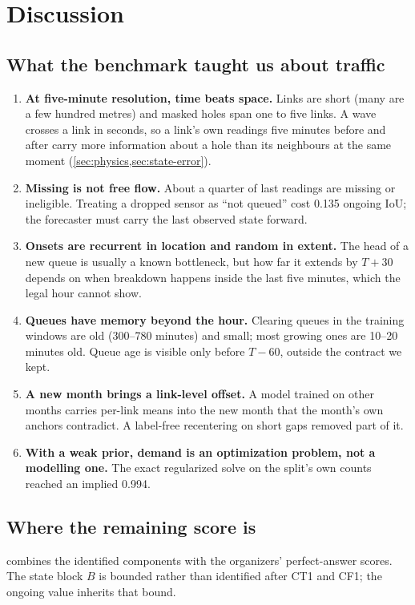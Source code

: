 \section{Discussion}\label{sec:discussion}

\subsection{What the benchmark taught us about traffic}
\begin{enumerate}
  \item \textbf{At five-minute resolution, time beats space.} Links are short (many are a few hundred metres) and masked
        holes span one to five links. A wave crosses a link in seconds, so a link's own readings five minutes before and
        after carry more information about a hole than its neighbours at the same moment (\cref{sec:physics,sec:state-error}).
  \item \textbf{Missing is not free flow.} About a quarter of last readings are missing or ineligible. Treating a dropped
        sensor as ``not queued'' cost 0.135 ongoing IoU; the forecaster must carry the last observed state forward.
  \item \textbf{Onsets are recurrent in location and random in extent.} The head of a new queue is usually a known
        bottleneck, but how far it extends by $T{+}30$ depends on when breakdown happens inside the last five minutes,
        which the legal hour cannot show.
  \item \textbf{Queues have memory beyond the hour.} Clearing queues in the training windows are old (300--780 minutes)
        and small; most growing ones are 10--20 minutes old. Queue age is visible only before $T{-}60$, outside the
        contract we kept.
  \item \textbf{A new month brings a link-level offset.} A model trained on other months carries per-link means into the
        new month that the month's own anchors contradict. A label-free recentering on short gaps removed part of it.
  \item \textbf{With a weak prior, demand is an optimization problem, not a modelling one.} The exact regularized solve on the
        split's own counts reached an implied 0.994.
\end{enumerate}

\subsection{Where the remaining score is}
 combines the identified components with the organizers' perfect-answer scores. The state block
$B$ is bounded rather than identified after CT1 and CF1; the ongoing value inherits that bound.

